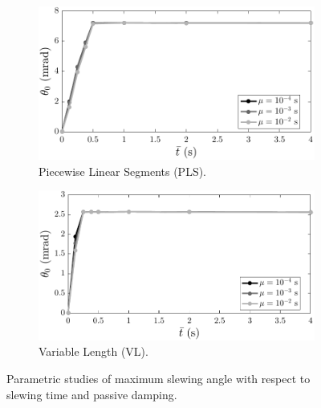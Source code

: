 \begin{figure}[t]
  \centering
  \begin{subfigure}[b]{0.495\textwidth}
    \centering
    \includegraphics[width=\columnwidth]{../ch7/figures/DampingPLS.pdf}
    \caption{Piecewise Linear Segments (PLS).}\label{fig:ch7:damping_pls}
  \end{subfigure}
  \begin{subfigure}[b]{0.495\textwidth}
    \centering
    \includegraphics[width=\columnwidth]{../ch7/figures/DampingVL.pdf}
    \caption{Variable Length (VL).}\label{fig:ch7:damping_vl}
  \end{subfigure}
  \caption{Parametric studies of maximum slewing angle with respect to slewing time and passive damping.\label{fig:ch7:damping}}
\end{figure}